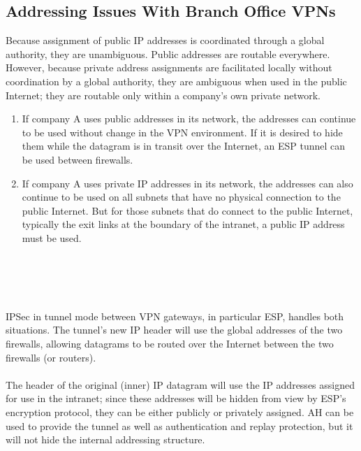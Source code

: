 \documentclass[10pt,a4paper]{article}
\begin{document}
\begin{itemize}
\begin{itemize}
\begin{itemize}
\subsection{Addressing Issues With Branch Office VPNs}
Because assignment of public IP addresses is coordinated through a global
authority, they are unambiguous. Public addresses are routable everywhere.
However, because private address assignments are facilitated locally without
coordination by a global authority, they are ambiguous when used in the public
Internet; they are routable only within a company's own private network.
\\
\begin{enumerate}
\item If company A uses public addresses in its network, the addresses can
continue to be used without change in the VPN environment. If it is desired to
hide them while the datagram is in transit over the Internet, an ESP tunnel can
be used between firewalls.
\item If company A uses private IP addresses in its network, the addresses can also
continue to be used on all subnets that have no physical connection to the
public Internet. But for those subnets that do connect to the public Internet,
typically the exit links at the boundary of the intranet, a public IP address must
be used.
\end{enumerate}
\\
\\
\\
\\
IPSec in tunnel mode between VPN gateways, in particular ESP, handles both
situations. The tunnel's new IP header will use the global addresses of the two
firewalls, allowing datagrams to be routed over the Internet between the two
firewalls (or routers). 
\\
\\
The header of the original (inner) IP datagram will use the
IP addresses assigned for use in the intranet; since these addresses will be
hidden from view by ESP's encryption protocol, they can be either publicly or
privately assigned. AH can be used to provide the tunnel as well as
authentication and replay protection, but it will not hide the internal addressing
structure.





\end{itemize}
\end{itemize}
\end{itemize}
\end{document}
